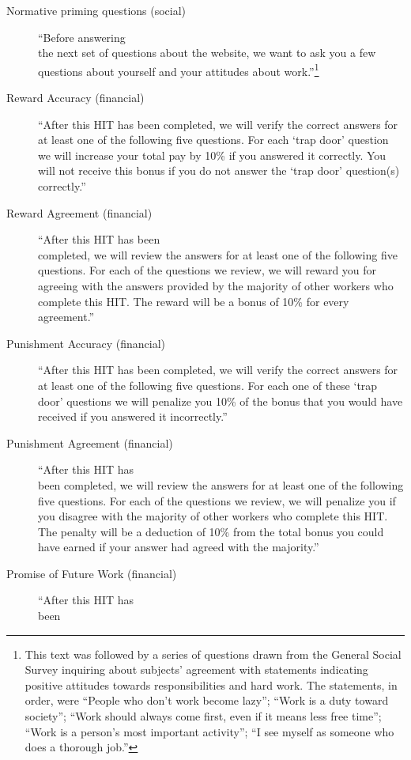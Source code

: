 \documentclass{cscw2010}
\begin{document}
\begin{description}
\item[Normative priming questions (social)] ``Before answering \\the next
  set of questions about the website, we want to ask you a few
  questions about yourself and your attitudes about
  work.''\footnote{This text was followed by a series of questions drawn from the General Social Survey inquiring about subjects' agreement with statements indicating positive attitudes towards responsibilities and hard work. The statements, in order, were ``People who don't work become lazy''; ``Work is a duty toward society''; ``Work should always come first, even if it means less free time''; ``Work is a person's most important activity''; ``I see myself as someone who does a thorough job.''} %
\item[Reward Accuracy (financial)] ``After this HIT has been completed,
  we will verify the correct answers for at least one of the following
  five questions. For each `trap door' question we will increase your
  total pay by 10\% if you answered it correctly. You will not receive
  this bonus if you do not answer the `trap door' question(s)
  correctly.'' %
\item[Reward Agreement (financial)] ``After this HIT has been\\
  completed, we will review the answers for at least one of the
  following five questions. For each of the questions we review, we
  will reward you for agreeing with the answers provided by the
  majority of other workers who complete this HIT. The reward will be
  a bonus of 10\% for every agreement.'' %
\item[Punishment Accuracy (financial)] ``After this HIT has been
  completed, we will verify the correct answers for at least one of
  the following five questions. For each one of these `trap door'
  questions we will penalize you 10\% of the bonus that you would have
  received if you answered it incorrectly.'' %
\item[Punishment Agreement (financial)] ``After this HIT has\\ been
  completed, we will review the answers for at least one of the
  following five questions. For each of the questions we review, we
  will penalize you if you disagree with the majority of other workers
  who complete this HIT. The penalty will be a deduction of 10\% from
  the total bonus you could have earned if your answer had agreed with
  the majority.'' %
\item[Promise of Future Work (financial)] ``After this HIT has \\been

\end{description}
\end{document}
